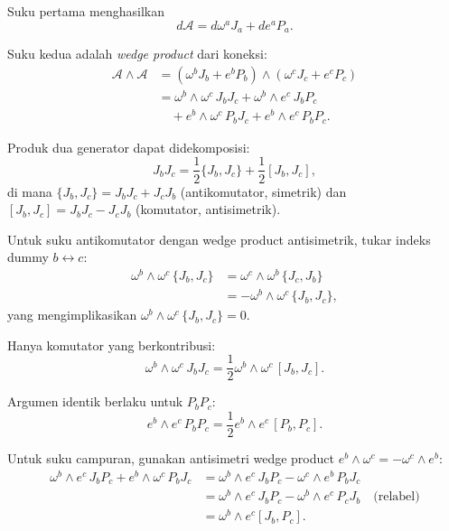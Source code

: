 \noindent Suku pertama menghasilkan
\begin{equation}
    d\mathcal{A}
    =
    d\omega^a J_a
    +
    de^a P_a.
\end{equation}
 
\noindent Suku kedua adalah \textit{wedge product} dari koneksi:
\begin{align}
    \mathcal{A} \wedge \mathcal{A} &= \left(\omega^b J_b + e^b P_b\right) \wedge \left(\omega^c J_c + e^c P_c\right) \nonumber \\
    &= \omega^b \wedge \omega^c \, J_b J_c + \omega^b \wedge e^c \, J_b P_c \nonumber \\
    &\quad + e^b \wedge \omega^c \, P_b J_c + e^b \wedge e^c \, P_b P_c. \label{w41-eq:wedge_expansion}
\end{align}
 
\noindent Produk dua generator dapat didekomposisi:
\begin{equation}
    J_b J_c = \frac{1}{2}\{J_b, J_c\} + \frac{1}{2}[J_b, J_c],
\end{equation}
di mana $\{J_b, J_c\} = J_b J_c + J_c J_b$ (antikomutator, simetrik) dan $[J_b, J_c] = J_b J_c - J_c J_b$ (komutator, antisimetrik).
 
\noindent Untuk suku antikomutator dengan wedge product antisimetrik, tukar indeks dummy $b \leftrightarrow c$:
\begin{align*}
    \omega^b \wedge \omega^c \, \{J_b, J_c\} &= \omega^c \wedge \omega^b \, \{J_c, J_b\} \\
    &= -\omega^b \wedge \omega^c \, \{J_b, J_c\},
\end{align*}
yang mengimplikasikan $\omega^b \wedge \omega^c \, \{J_b, J_c\} = 0$. 
 
\noindent Hanya komutator yang berkontribusi:
\begin{equation}
    \omega^b \wedge \omega^c \, J_b J_c = \frac{1}{2} \omega^b \wedge \omega^c \, [J_b, J_c].
\end{equation}
 
\noindent Argumen identik berlaku untuk $P_b P_c$:
\begin{equation}
    e^b \wedge e^c \, P_b P_c = \frac{1}{2} e^b \wedge e^c \, [P_b, P_c].
\end{equation}
 
\noindent Untuk suku campuran, gunakan antisimetri wedge product $e^b \wedge \omega^c = -\omega^c \wedge e^b$:
\begin{align*}
    \omega^b \wedge e^c \, J_b P_c + e^b \wedge \omega^c \, P_b J_c &= \omega^b \wedge e^c \, J_b P_c - \omega^c \wedge e^b \, P_b J_c \\
    &= \omega^b \wedge e^c \, J_b P_c - \omega^b \wedge e^c \, P_c J_b \quad \text{(relabel)} \\
    &= \omega^b \wedge e^c [J_b, P_c].
\end{align*}
 
